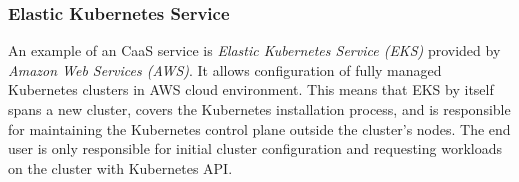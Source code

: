 \subsubsection{Elastic Kubernetes Service}
\label{s:ProblemDomain:EKS}

An example of an CaaS service is \emph{Elastic Kubernetes Service (EKS)} \cite{b:IBM-CaaS} provided by \emph{Amazon Web Services (AWS)}.
It allows configuration of fully managed Kubernetes clusters \cite{b:AWS-EKS} in AWS cloud environment.
This means that EKS by itself spans a new cluster, covers the Kubernetes installation process, and is responsible for maintaining the Kubernetes control plane outside the cluster's nodes.
The end user is only responsible for initial cluster configuration and requesting workloads on the cluster with Kubernetes API.